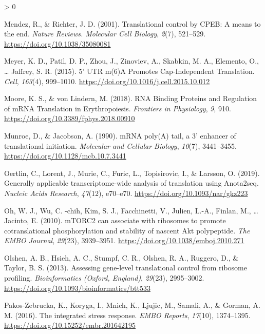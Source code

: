 \documentclass[
  12pt,
  openany]{book}
\newlength{\cslhangindent}
\newenvironment{CSLReferences}[2] %
 {%
  \setlength{\parindent}{0pt}
  \ifodd #1 \everypar{\setlength{\hangindent}{\cslhangindent}}\ignorespaces\fi
  \ifnum #2 > 0
  \setlength{\parskip}{#2\baselineskip}
  \fi
 }%
 {}
\begin{document}
\begin{CSLReferences}{1}{0}
\leavevmode\hypertarget{ref-Mendez2001}{}%
Mendez, R., \& Richter, J. D. (2001). Translational control by {CPEB}: A means to the end. \emph{Nature Reviews. Molecular Cell Biology}, \emph{2}(7), 521--529. \url{https://doi.org/10.1038/35080081}

\leavevmode\hypertarget{ref-Meyer2015}{}%
Meyer, K. D., Patil, D. P., Zhou, J., Zinoviev, A., Skabkin, M. A., Elemento, O., \ldots{} Jaffrey, S. R. (2015). 5' {UTR} m(6){A Promotes Cap}-{Independent Translation}. \emph{Cell}, \emph{163}(4), 999--1010. \url{https://doi.org/10.1016/j.cell.2015.10.012}

\leavevmode\hypertarget{ref-Moore2018}{}%
Moore, K. S., \& von Lindern, M. (2018). {RNA Binding Proteins} and {Regulation} of {mRNA Translation} in {Erythropoiesis}. \emph{Frontiers in Physiology}, \emph{9}, 910. \url{https://doi.org/10.3389/fphys.2018.00910}

\leavevmode\hypertarget{ref-Munroe1990}{}%
Munroe, D., \& Jacobson, A. (1990). {mRNA} poly({A}) tail, a 3' enhancer of translational initiation. \emph{Molecular and Cellular Biology}, \emph{10}(7), 3441--3455. \url{https://doi.org/10.1128/mcb.10.7.3441}

\leavevmode\hypertarget{ref-Oertlin2019}{}%
Oertlin, C., Lorent, J., Murie, C., Furic, L., Topisirovic, I., \& Larsson, O. (2019). Generally applicable transcriptome-wide analysis of translation using Anota2seq. \emph{Nucleic Acids Research}, \emph{47}(12), e70--e70. \url{https://doi.org/10.1093/nar/gkz223}

\leavevmode\hypertarget{ref-Oh2010}{}%
Oh, W. J., Wu, C. -chih, Kim, S. J., Facchinetti, V., Julien, L.-A., Finlan, M., \ldots{} Jacinto, E. (2010). {mTORC2} can associate with ribosomes to promote cotranslational phosphorylation and stability of nascent {Akt} polypeptide. \emph{The EMBO Journal}, \emph{29}(23), 3939--3951. \url{https://doi.org/10.1038/emboj.2010.271}

\leavevmode\hypertarget{ref-Olshen2013}{}%
Olshen, A. B., Hsieh, A. C., Stumpf, C. R., Olshen, R. A., Ruggero, D., \& Taylor, B. S. (2013). Assessing gene-level translational control from ribosome profiling. \emph{Bioinformatics (Oxford, England)}, \emph{29}(23), 2995--3002. \url{https://doi.org/10.1093/bioinformatics/btt533}

\leavevmode\hypertarget{ref-Pakos-Zebrucka2016}{}%
Pakos-Zebrucka, K., Koryga, I., Mnich, K., Ljujic, M., Samali, A., \& Gorman, A. M. (2016). The integrated stress response. \emph{EMBO Reports}, \emph{17}(10), 1374--1395. \url{https://doi.org/10.15252/embr.201642195}


\end{CSLReferences}
\end{document}
